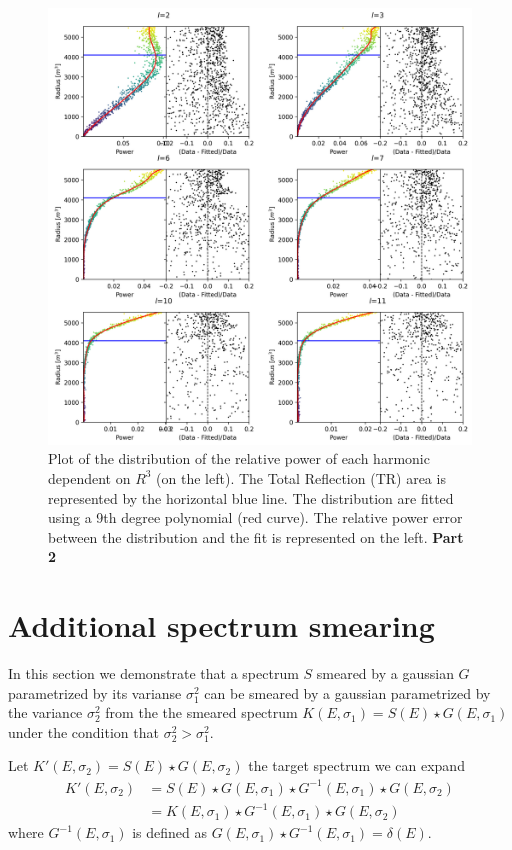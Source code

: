 \documentclass[../main.tex]{subfiles}
\begin{document}
\begin{figure}[ht]
  \centering
  \includegraphics[width=\linewidth]{images/jgnn/harmonic/power_fit_pt2.png}
  \caption{Plot of the distribution of the relative power of each harmonic dependent on $R^3$ (on the left). The Total Reflection (TR) area is represented by the horizontal blue line. The distribution are fitted using a 9th degree polynomial (red curve). The relative power error between the distribution and the fit is represented on the left. \textbf{Part 2}}
  \label{fig:annex:jgnn:harmonic:fit2}
\end{figure}

\chapter{Additional spectrum smearing}
\label{sec:annex:oversmearing}

In this section we demonstrate that a spectrum $S$ smeared by a gaussian $G$ parametrized by its varianse $\sigma_1^2$ can be smeared by a gaussian parametrized by the variance $\sigma_2^2$ from the the smeared spectrum $K(E, \sigma_1) = S(E) \star G(E, \sigma_1)$ under the condition that $\sigma_2^2 > \sigma_1^2$.

Let $K'(E,\sigma_2) = S(E) \star G(E, \sigma_2)$ the target spectrum we can expand
\begin{align}
  K'(E, \sigma_2) &= S(E) \star G(E, \sigma_1) \star G^{-1}(E, \sigma_1) \star G(E, \sigma_2) \\
                  &= K(E, \sigma_1) \star G^{-1}(E, \sigma_1) \star G(E, \sigma_2)
\end{align}
where $G^{-1}(E, \sigma_1)$ is defined as $G(E, \sigma_1) \star G^{-1}(E, \sigma_1) = \delta(E)$.
\end{document}
